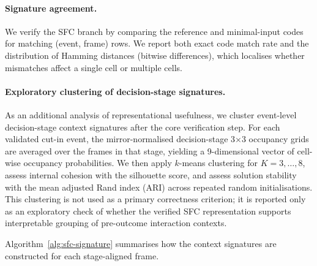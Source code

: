 \documentclass[12pt,a4paper,twoside,openright]{report}
\begin{document}
    \paragraph{Signature agreement.}
    We verify the SFC branch by comparing the reference and minimal-input codes for matching (event, frame) rows. We report both exact code match rate and the distribution of Hamming distances (bitwise differences), which localises whether mismatches affect a single cell or multiple cells.

    \paragraph{Exploratory clustering of decision-stage signatures.}
    As an additional analysis of representational usefulness, we cluster event-level decision-stage context signatures after the core verification step. For each validated cut-in event, the mirror-normalised decision-stage 3$\times$3 occupancy grids are averaged over the frames in that stage, yielding a 9-dimensional vector of cell-wise occupancy probabilities. We then apply $k$-means clustering for $K=3,\dots,8$, assess internal cohesion with the silhouette score, and assess solution stability with the mean adjusted Rand index (ARI) across repeated random initialisations. This clustering is not used as a primary correctness criterion; it is reported only as an exploratory check of whether the verified SFC representation supports interpretable grouping of pre-outcome interaction contexts.

    Algorithm~\ref{alg:sfc-signature} summarises how the context signatures are constructed for each stage-aligned frame.

    \begin{algorithm}[t]
\caption{Ego-centric occupancy grid and space-filling-curve context signature}
\label{alg:sfc-signature}

    \end{algorithm}
\end{document}
